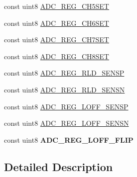 \begin{DoxyCompactItemize}
\item 
const uint8 \hyperlink{group___chn_set_ga730a2a0c20cb0e88bafcfbef3aafa744}{A\-D\-C\-\_\-\-R\-E\-G\-\_\-\-C\-H5\-S\-E\-T}
\item 
const uint8 \hyperlink{group___chn_set_ga974eda2525409dc9515c2e69e73e601a}{A\-D\-C\-\_\-\-R\-E\-G\-\_\-\-C\-H6\-S\-E\-T}
\item 
const uint8 \hyperlink{group___chn_set_ga19b095189e2b2d5107e93ac5a7ab7bb6}{A\-D\-C\-\_\-\-R\-E\-G\-\_\-\-C\-H7\-S\-E\-T}
\item 
const uint8 \hyperlink{group___chn_set_gaa7911af5128674fcfacbb82224084f47}{A\-D\-C\-\_\-\-R\-E\-G\-\_\-\-C\-H8\-S\-E\-T}
\item 
const uint8 \hyperlink{group___chn_set_ga77bb24429b6cb783858cc6feecbfa12f}{A\-D\-C\-\_\-\-R\-E\-G\-\_\-\-R\-L\-D\-\_\-\-S\-E\-N\-S\-P}
\item 
const uint8 \hyperlink{group___chn_set_ga4eabf000e661fa1c6a38e154e4a7285f}{A\-D\-C\-\_\-\-R\-E\-G\-\_\-\-R\-L\-D\-\_\-\-S\-E\-N\-S\-N}
\item 
const uint8 \hyperlink{group___chn_set_gab24041e1f2980917fa7e2ee3d82884bb}{A\-D\-C\-\_\-\-R\-E\-G\-\_\-\-L\-O\-F\-F\-\_\-\-S\-E\-N\-S\-P}
\item 
const uint8 \hyperlink{group___chn_set_ga3f94421e1bdc9192ff9ca7dc66ca4ca4}{A\-D\-C\-\_\-\-R\-E\-G\-\_\-\-L\-O\-F\-F\-\_\-\-S\-E\-N\-S\-N}
\item 
\hypertarget{group___chn_set_gacb5f6c04a7817b510e959fc036b4f8c6}{const uint8 {\bfseries A\-D\-C\-\_\-\-R\-E\-G\-\_\-\-L\-O\-F\-F\-\_\-\-F\-L\-I\-P}}\label{group___chn_set_gacb5f6c04a7817b510e959fc036b4f8c6}

\end{DoxyCompactItemize}


\subsection{Detailed Description}



